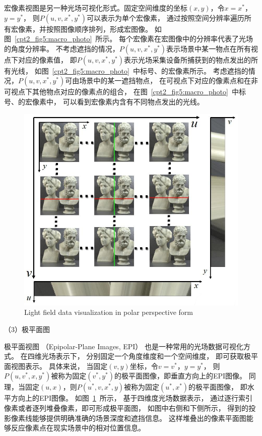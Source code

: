 宏像素视图是另一种光场可视化形式。固定空间维度的坐标$(x, y)$，令$x=x^{*}$，$y=y^{*}$，
则$ P(u, v, x^{*}, y^{*})$可以表示为单个宏像素，
通过按照空间分辨率遍历所有宏像素，并按照图像顺序排列，形成宏图像。
如图~\ref{cpt2_fig5:macro_photo}~所示。
每个宏像素在宏图像中的分辨率代表了光场的角度分辨率。
%
不考虑遮挡的情况，$ P(u, v, x^{*}, y^{*})$表示场景中某一物点在所有视点下对应的像素值，
即$ P(u, v, x^{*}, y^{*})$表示光场采集设备所捕获到的物点发出的所有光线，
如图~\ref{cpt2_fig5:macro_photo}~中标号、的宏像素所示。
考虑遮挡的情况，$ P(u, v, x^{*}, y^{*})$可由场景中的某一遮挡物点，
在可视点下对应的像素点和在非可视点下其他物点对应的像素点的组合，
在图~\ref{cpt2_fig5:macro_photo}~中标号、的宏像素中，
可以看到宏像素内含有不同物点发出的光线。\par
%
%
%
%
%
\begin{figure}[!ht]
	\centering
	\includegraphics[width=0.75\linewidth]{figures/chapter2/epi_photos}
	{Light field data visualization in polar perspective form}  
	\label{cpt2_fig6:epi_photos}
\end{figure}
%
%
%







（3）极平面图





极平面视图
（Epipolar-Plane Images, EPI）
也是一种常用的光场数据可视化方式。
在四维光场表示下，
分别固定一个角度维度和一个空间维度，
即可获取极平面视图表示。
具体来说，
当固定$(v, y)$坐标，令$v=v^{*}$，$y=y^{*}$，
则$ P(u, v^{*}, x, y^{*})$被称为固定$(v^{*}, y^{*})$的极平面图像，即垂直方向上的EPI图像。
同理，当固定$(u, x)$，则$ P(u^{*}, v, x^{*}, y)$被称为固定$(u^{*}, x^{*})$的极平面图像，
即水平方向上的EPI图像。
如图~\ref{cpt2_fig6:epi_photos}~所示，
基于四维度光场数据表示，
通过逐行索引像素或者逐列堆叠像素，即可形成极平面图，
如图中右侧和下侧所示，
得到的投影像素线能够提供明确准确的场景深度和遮挡信息。
这样堆叠出的像素平面图能够反应像素点在现实场景中的相对位置信息。




